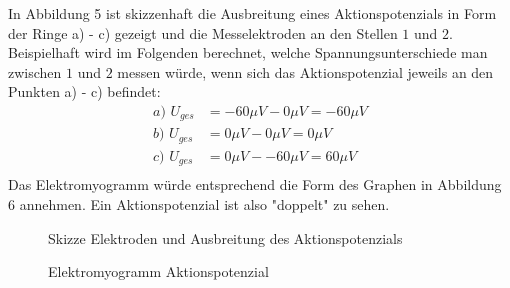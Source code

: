 In Abbildung 5 ist skizzenhaft die Ausbreitung eines Aktionspotenzials in Form der Ringe a) - c) gezeigt und die Messelektroden an den Stellen $1$ und $2$. Beispielhaft wird im Folgenden berechnet, welche Spannungsunterschiede man zwischen $1$ und $2$ messen würde, wenn sich das Aktionspotenzial jeweils an den Punkten a) - c) befindet: 
\begin{align*}
a)\,\, U_{ges} &= -60\mu V - 0\mu V =  -60\mu V\\
b)\,\, U_{ges} &= 0\mu V - 0\mu V =  0\mu V\\
c)\,\, U_{ges} &= 0\mu V - -60\mu V =  60\mu V\\
\end{align*}
Das Elektromyogramm würde entsprechend die Form des Graphen in Abbildung 6 annehmen. Ein Aktionspotenzial ist also "{}doppelt"{} zu sehen. 
\begin{figure}[H]
\caption{Skizze Elektroden und Ausbreitung des Aktionspotenzials}
\label{diff}
\end{figure}

\begin{figure}[H]
\caption{Elektromyogramm Aktionspotenzial}
\label{plot_elektromyogramm}
\end{figure}

